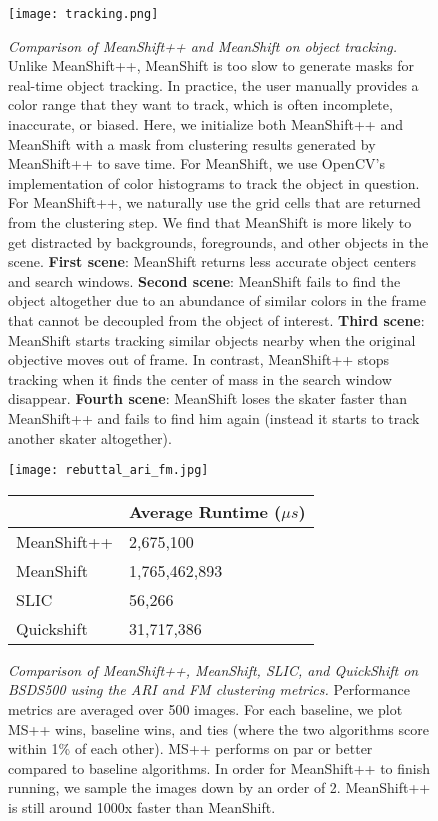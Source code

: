 \begin{figure*}
\begin{center}
\texttt{[image: tracking.png]}
\end{center}
   \caption{\label{fig:object_tracking}\textit{Comparison of MeanShift++ and MeanShift on object tracking.} Unlike MeanShift++, MeanShift is too slow to generate masks for real-time object tracking. In practice, the user manually provides a color range that they want to track, which is often incomplete, inaccurate, or biased. Here, we initialize both MeanShift++ and MeanShift with a mask from clustering results generated by MeanShift++ to save time. For MeanShift, we use OpenCV's \cite{bradski2008learning} implementation of color histograms to track the object in question. For MeanShift++, we naturally use the grid cells that are returned from the clustering step. We find that MeanShift is more likely to get distracted by backgrounds, foregrounds, and other objects in the scene. {\bf First scene}: MeanShift returns less accurate object centers and search windows. {\bf Second scene}: MeanShift fails to find the object altogether due to an abundance of similar colors in the frame that cannot be decoupled from the object of interest. {\bf Third scene}: MeanShift starts tracking similar objects nearby when the original objective moves out of frame. In contrast, MeanShift++ stops tracking when it finds the center of mass in the search window disappear. {\bf Fourth scene}: MeanShift loses the skater faster than MeanShift++ and fails to find him again (instead it starts to track another skater altogether).}
\end{figure*}

\begin{figure}
\begin{center}
\texttt{[image: rebuttal\_ari\_fm.jpg]}
\begin{tabular}{ |p{2.2cm}||p{3.8cm}| }
    \hline
    & Average Runtime ($\mu s$) \\
    \hline
    MeanShift++ & 2,675,100 \\
    \hline
    MeanShift & 1,765,462,893 \\
    \hline
    SLIC & 56,266 \\
    \hline
    Quickshift & 31,717,386 \\
    \hline
\end{tabular}
\end{center}
   \caption{\label{fig:bsds500}\textit{Comparison of MeanShift++, MeanShift, SLIC, and QuickShift on BSDS500 using the ARI and FM clustering metrics.} Performance metrics are averaged over 500 images. For each baseline, we plot MS++ wins, baseline wins, and ties (where the two algorithms score within 1\% of each other). MS++ performs on par or better compared to baseline algorithms. In order for MeanShift++ to finish running, we sample the images down by an order of 2. MeanShift++ is still around 1000x faster than MeanShift.}
\label{fig:short}
\end{figure}